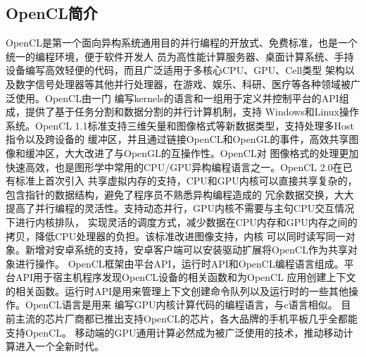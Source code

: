 \subsection{OpenCL简介}
OpenCL是第一个面向异构系统通用目的并行编程的开放式、免费标准，也是一个统一的编程环境，便于软件开发人
员为高性能计算服务器、桌面计算系统、手持设备编写高效轻便的代码，而且广泛适用于多核心CPU、GPU、Cell类型
架构以及数字信号处理器等其他并行处理器，在游戏、娱乐、科研、医疗等各种领域被广泛使用。OpenCL由一门
编写kernels的语言和一组用于定义并控制平台的API组成，提供了基于任务分割和数据分割的并行计算机制，支持
Windows和Linux操作系统。OpenCL 1.1标准支持三维矢量和图像格式等新数据类型，支持处理多Host指令以及跨设备的
缓冲区，并且通过链接OpenCL和OpenGL的事件，高效共享图像和缓冲区，大大改进了与OpenGL的互操作性。OpenCL对
图像格式的处理更加快速高效，也是图形学中常用的CPU/GPU异构编程语言之一。OpenCL 2.0在已有标准上首次引入
共享虚拟内存的支持，CPU和GPU内核可以直接共享复杂的，包含指针的数据结构，避免了程序员不熟悉异构编程造成的
冗余数据交换，大大提高了并行编程的灵活性。支持动态并行，GPU内核不需要与主句CPU交互情况下进行内核排队，
实现灵活的调度方式，减少数据在CPU内存和GPU内存之间的拷贝，降低CPU处理器的负担。该标准改进图像支持，内核
可以同时读写同一对象。新增对安卓系统的支持，安卓客户端可以安装驱动扩展将OpenCL作为共享对象进行操作。
OpenCL框架由平台API，运行时API和OpenCL编程语言组成。平台API用于宿主机程序发现OpenCL设备的相关函数和为OpenCL
应用创建上下文的相关函数。运行时API是用来管理上下文创建命令队列以及运行时的一些其他操作。OpenCL语言是用来
编写GPU内核计算代码的编程语言，与c语言相似。
目前主流的芯片厂商都已推出支持OpenCL的芯片，各大品牌的手机平板几乎全都能支持OpenCL。
移动端的GPU通用计算必然成为被广泛使用的技术，推动移动计算进入一个全新时代。


